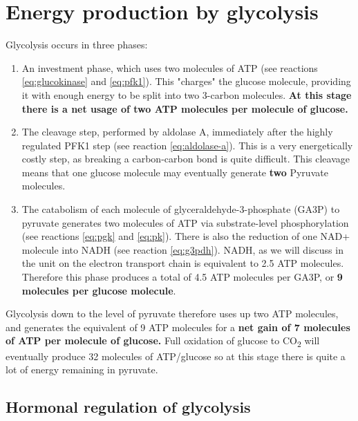 \documentclass{tufte-handout}
\begin{document}
\section{Energy production by glycolysis}

Glycolysis occurs in three phases:

\begin{enumerate}
\item An investment phase, which uses two molecules of ATP (see reactions \ref{eq:glucokinase} and \ref{eq:pfk1}).  This "charges" the glucose molecule, providing it with enough energy to be split into two 3-carbon molecules.  \textbf{At this stage there is a net usage of two ATP molecules per molecule of glucose.}
\item The cleavage step, performed by aldolase A, immediately after the highly regulated PFK1 step (see reaction \ref{eq:aldolase-a}).  This is a very energetically costly step, as breaking a carbon-carbon bond is quite difficult.  This cleavage means that one glucose molecule may eventually generate \textbf{two} Pyruvate molecules.
\item The catabolism of each molecule of glyceraldehyde-3-phosphate (GA3P) to pyruvate generates two molecules of ATP via substrate-level phosphorylation (see reactions \ref{eq:pgk} and \ref{eq:pk}).  There is also the reduction of one NAD+ molecule into NADH (see reaction \ref{eq:g3pdh}).  NADH, as we will discuss in the unit on the electron transport chain is equivalent to 2.5 ATP molecules.  Therefore this phase produces a total of 4.5 ATP molecules per GA3P, or \textbf{9 molecules per glucose molecule}.
\end{enumerate}

Glycolysis down to the level of pyruvate therefore uses up two ATP molecules, and generates the equivalent of 9 ATP molecules for a \textbf{net gain of 7 molecules of ATP per molecule of glucose.}  Full oxidation of glucose to CO\textsubscript{2} will eventually produce 32 molecules of ATP/glucose so at this stage there is quite a lot of energy remaining in pyruvate.

\subsection{Hormonal regulation of glycolysis}
\end{document}
